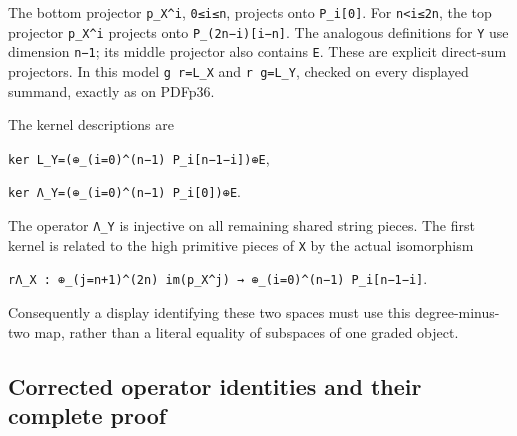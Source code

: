 \documentclass[
  10pt,
]{article}
\begin{document}
The bottom projector
\texttt{\small p\_\allowbreak{}X\textasciicircum{}i},
\texttt{\small 0≤\allowbreak{}i≤\allowbreak{}n}, projects onto
\texttt{\small P\_\allowbreak{}i[\allowbreak{}0]\allowbreak{}}. For
\texttt{\small n<i≤\allowbreak{}2n}, the top projector
\texttt{\small p\_\allowbreak{}X\textasciicircum{}i} projects onto
\texttt{\small P\_\allowbreak{}(\allowbreak{}2n−i)\allowbreak{}[\allowbreak{}i−n]\allowbreak{}}.
The analogous definitions for \texttt{\small Y} use dimension
\texttt{\small n−1}; its middle projector also contains
\texttt{\small E}. These are explicit direct-sum projectors. In this
model \texttt{\small g r=\allowbreak{}L\_\allowbreak{}X} and
\texttt{\small r g=\allowbreak{}L\_\allowbreak{}Y}, checked on every
displayed summand, exactly as on PDFp36.

The kernel descriptions are

\texttt{\small ker L\_\allowbreak{}Y=\allowbreak{}(\allowbreak{}⊕\allowbreak{}\_\allowbreak{}(\allowbreak{}i=\allowbreak{}0)\allowbreak{}\textasciicircum{}(\allowbreak{}n−1)\allowbreak{} P\_\allowbreak{}i[\allowbreak{}n−1−i]\allowbreak{})\allowbreak{}⊕\allowbreak{}E},

\texttt{\small ker Λ\_\allowbreak{}Y=\allowbreak{}(\allowbreak{}⊕\allowbreak{}\_\allowbreak{}(\allowbreak{}i=\allowbreak{}0)\allowbreak{}\textasciicircum{}(\allowbreak{}n−1)\allowbreak{} P\_\allowbreak{}i[\allowbreak{}0]\allowbreak{})\allowbreak{}⊕\allowbreak{}E}.

The operator \texttt{\small Λ\_\allowbreak{}Y} is injective on all
remaining shared string pieces. The first kernel is related to the high
primitive pieces of \texttt{\small X} by the actual isomorphism

\texttt{\small rΛ\_\allowbreak{}X :\allowbreak{} ⊕\allowbreak{}\_\allowbreak{}(\allowbreak{}j=\allowbreak{}n+\allowbreak{}1)\allowbreak{}\textasciicircum{}(\allowbreak{}2n)\allowbreak{} im(\allowbreak{}p\_\allowbreak{}X\textasciicircum{}j)\allowbreak{} →\allowbreak{} ⊕\allowbreak{}\_\allowbreak{}(\allowbreak{}i=\allowbreak{}0)\allowbreak{}\textasciicircum{}(\allowbreak{}n−1)\allowbreak{} P\_\allowbreak{}i[\allowbreak{}n−1−i]\allowbreak{}}.

Consequently a display identifying these two spaces must use this
degree-minus-two map, rather than a literal equality of subspaces of one
graded object.

\subsection{Corrected operator identities and their complete
proof}\label{corrected-operator-identities-and-their-complete-proof}
\end{document}
